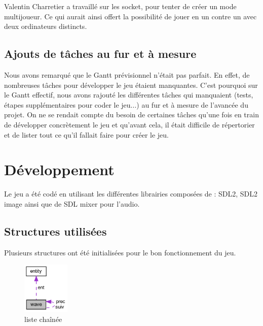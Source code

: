\documentclass[a4paper,11pt]{article}
\begin{document}
Valentin Charretier a travaillé sur les socket, pour tenter de créer un mode multijoueur. Ce qui aurait ainsi offert la possibilité de jouer en un contre un avec deux ordinateurs distincts.\\

\subsection{Ajouts de tâches au fur et à mesure}
Nous avons remarqué que le Gantt prévisionnel n'était pas parfait. En effet, de nombreuses tâches pour développer le jeu étaient manquantes. C'est pourquoi sur le Gantt effectif, nous avons rajouté les différentes tâches qui manquaient (tests, étapes supplémentaires pour coder le jeu...) au fur et à mesure de l'avancée du projet. On ne se rendait compte du besoin de certaines tâches qu'une fois en train de développer concrètement le jeu et qu'avant cela, il était difficile de répertorier et de lister tout ce qu'il fallait faire pour créer le jeu.\\

\section{Développement}
Le jeu a été codé en utilisant les différentes librairies composées de : SDL2, SDL2 image ainsi que de SDL mixer pour l'audio.

\subsection{Structures utilisées}
Plusieurs structures ont été initialisées pour le bon fonctionnement du jeu.\\ 

\begin{figure}[ht!]
    \centering
    \includegraphics [width=0.2\textwidth]{struct wave.png} 
    \caption {\label{image5} liste chaînée}
    \end{figure}
     \smallbreak
\end{document}
